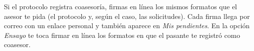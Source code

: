 \documentclass[11pt,a4paper]{article}
\begin{document}
{\small\tableofcontents}
\newpage
\begin{quevasahacer}
Si el protocolo registra coasesoría, firmas en línea los mismos formatos que el asesor te pida (el protocolo y, según el caso, las solicitudes). Cada firma llega por correo con un enlace personal y también aparece en \emph{Mis pendientes}. En la opción \emph{Ensayo} te toca firmar en línea los formatos en que el pasante te registró como coasesor.
\end{quevasahacer}



\end{document}
